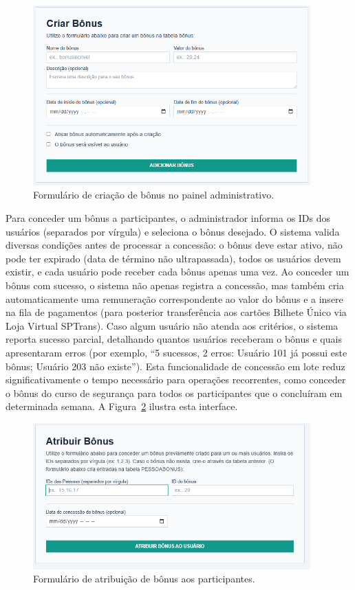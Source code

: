  \begin{figure}[H]
   \centering
   \includegraphics[width=0.95\textwidth]{figuras/criar_bonus.PNG}
   \caption{Formulário de criação de bônus no painel administrativo.}
   \label{fig:bonus_criar_form}
 \end{figure}

Para conceder um bônus a participantes, o
administrador informa os IDs dos usuários (separados por vírgula) e seleciona o
bônus desejado. O sistema valida diversas condições antes de processar a
concessão: o bônus deve estar ativo, não pode ter expirado (data de término não
ultrapassada), todos os usuários devem existir, e cada usuário pode receber cada
bônus apenas uma vez. Ao conceder um bônus com sucesso, o sistema não apenas registra a concessão, mas
também cria automaticamente uma remuneração correspondente ao valor do bônus e a
insere na fila de pagamentos (para posterior transferência aos cartões Bilhete
Único via Loja Virtual SPTrans). Caso algum usuário não atenda aos critérios, o
sistema reporta sucesso parcial, detalhando quantos usuários receberam o bônus e
quais apresentaram erros (por exemplo, ``5 sucessos, 2 erros: Usuário 101 já
possui este bônus; Usuário 203 não existe''). Esta funcionalidade de concessão em
lote reduz significativamente o tempo necessário para operações recorrentes, como
conceder o bônus do curso de segurança para todos os participantes que o
concluíram em determinada semana. A Figura~\ref{fig:bonus_atribuir_form} ilustra esta interface.

 \begin{figure}[H]
   \centering
   \includegraphics[width=0.95\textwidth]{figuras/atribuir_bonus.PNG}
   \caption{Formulário de atribuição de bônus aos participantes.}
   \label{fig:bonus_atribuir_form}
 \end{figure}

